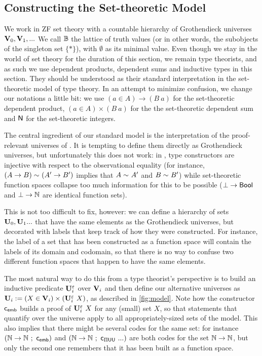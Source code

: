 \subsection{Constructing the Set-theoretic Model}

We work in ZF set theory with a countable hierarchy of Grothendieck universes
\( \mathbf{V}_0, \mathbf{V}_1, ... \)
%
We call \( \mathbb{B} \) the lattice of truth values (or in other words, the
subobjects of the singleton set \( \{ * \} \)), with \( \emptyset \) as its 
minimal value.
%
Even though we stay in the world of set theory for the duration of
this section, we remain type theorists, and as such
we use dependent products, dependent sums and inductive types in this
section. They should be understood as their standard interpretation in
the set-theoretic model of type theory.
%
In an attempt to minimize confusion, we change our notations a little
bit: we use \( (a \in A) \to (B\ a) \) for the set-theoretic dependent product,
\( (a \in A) \times (B\ a) \) for the the set-theoretic dependent sum and
\( \mathsf{N} \) for the set-theoretic integers.

The central ingredient of our standard model is the interpretation of the
proof-relevant universes of \SetoidCC.
%
It is tempting to define them directly as Grothendieck universes, but 
unfortunately this does not work: in \SetoidCC, type constructors are 
injective with respect to the observational equality
(for instance, \( ({A} \to {B}) \sim_{} ({A'} \to {B'}) \) implies that
\( A \sim_{} A' \) and \( B \sim_{} B' \)) while set-theoretic function
spaces collapse too much information for this to be possible
(\( {\bot} \to {\mathsf{Bool}} \) and \( {\bot} \to {\mathbb{N}} \) are identical function 
sets).

This is not too difficult to fix, however: 
% 
we can define a hierarchy of sets \( \mathbf{U}_0 , \mathbf{U}_1 ... \) that have the same 
elements as the Grothendieck universes, but decorated with labels that keep 
track of how they were constructed. For instance, the label of a set that has 
been constructed as a function space will contain the labels of its domain and 
codomain, so that there is no way to confuse two different function spaces that happen
to have the same elements. 

The most natural way to do this from a type
theorist's perspective is to build an inductive predicate \( \mathbf{U}^{\varepsilon}_i \) over
\( \mathbf{V}_i \) and then define our alternative universes as
\( \mathbf{U}_i := (X \in \mathbf{V}_i)\times(\mathbf{U}^{\varepsilon}_i\ X) \), as described in \cref{fig:model}.
%
Note how the constructor \( \mathsf{c}_\mathsf{emb} \) builds a proof of \( \mathbf{U}^{\varepsilon}_i\ X \)
for any (small) set \( X \), so that \SetoidCC statements that quantify over
the universe apply to all appropriately-sized sets of the model.
%
This also implies that there might be several codes for the
same set: for instance \( ({\mathbb{N}} \to {\mathbb{N}} \ ;\ \mathsf{c}_\mathsf{emb}) \) and
\( ({\mathbb{N}} \to {\mathbb{N}} \ ;\ \mathsf{c}_{\Pi\mathsf{UU}}\ ...) \) are both codes for
the set \( {\mathbb{N}} \to {\mathbb{N}} \), but only the second one remembers that it
has been built as a function space.

